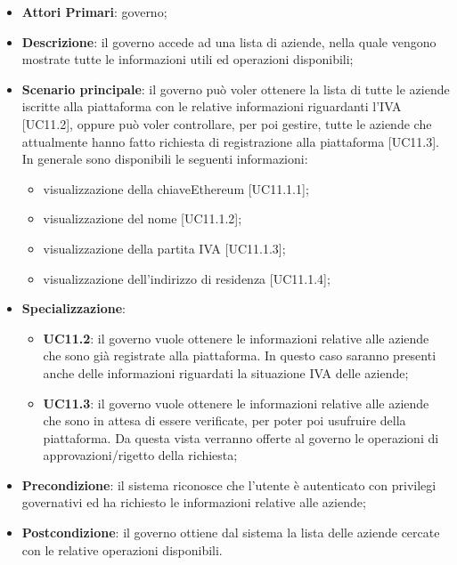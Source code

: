  \begin{itemize}
 	\item \textbf{Attori Primari}: governo;
 	\item \textbf{Descrizione}: il governo accede ad una lista di aziende, nella quale vengono mostrate tutte le informazioni utili ed operazioni disponibili;
 	\item \textbf{Scenario principale}: il governo può voler ottenere la lista di tutte le aziende iscritte alla piattaforma con le relative informazioni riguardanti l'IVA [UC11.2], oppure può voler controllare, per poi gestire, tutte le aziende che attualmente hanno fatto richiesta di registrazione alla piattaforma [UC11.3]. In generale sono disponibili le seguenti informazioni:
 	\begin{itemize}
 		\item visualizzazione della chiave\glosp Ethereum [UC11.1.1];
 		\item visualizzazione del nome [UC11.1.2];
 		\item visualizzazione della partita IVA [UC11.1.3];
 		\item visualizzazione dell'indirizzo di residenza [UC11.1.4];
 		
 	\end{itemize}
	\item \textbf{Specializzazione}:
	\begin{itemize}
	 	\item \textbf{UC11.2}: il governo vuole ottenere le informazioni relative alle aziende che sono già registrate alla piattaforma. In questo caso saranno presenti anche delle informazioni riguardati la situazione IVA delle aziende;
	 	\item \textbf{UC11.3}: il governo vuole ottenere le informazioni relative alle aziende che sono in attesa di essere verificate, per poter poi usufruire della piattaforma. Da questa vista verranno offerte al governo le operazioni di approvazioni/rigetto della richiesta;
	\end{itemize}
 	\item \textbf{Precondizione}: il sistema riconosce che l'utente è autenticato con privilegi governativi ed ha richiesto le informazioni relative alle aziende;
 	\item \textbf{Postcondizione}: il governo ottiene dal sistema la lista delle aziende cercate con le relative operazioni disponibili.
\end{itemize}
